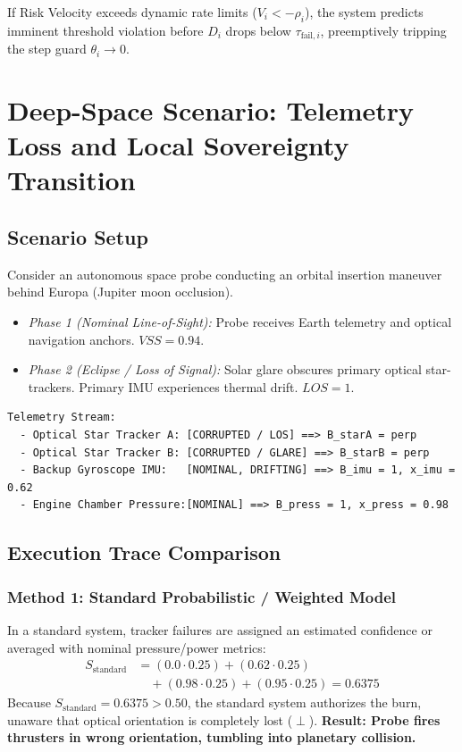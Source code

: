 \documentclass[journal]{IEEEtran}
\begin{document}
If Risk Velocity exceeds dynamic rate limits ($V_i < -\rho_i$), the system predicts imminent threshold violation before $D_i$ drops below $\tau_{\text{fail}, i}$, preemptively tripping the step guard $\theta_i \to 0$.

\section{Deep-Space Scenario: Telemetry Loss and Local Sovereignty Transition}

\subsection{Scenario Setup}
Consider an autonomous space probe conducting an orbital insertion maneuver behind Europa (Jupiter moon occlusion).
\begin{itemize}
    \item \emph{Phase 1 (Nominal Line-of-Sight):} Probe receives Earth telemetry and optical navigation anchors. $VSS = 0.94$.
    \item \emph{Phase 2 (Eclipse / Loss of Signal):} Solar glare obscures primary optical star-trackers. Primary IMU experiences thermal drift. $LOS = 1$.
\end{itemize}

\begin{verbatim}
Telemetry Stream:
  - Optical Star Tracker A: [CORRUPTED / LOS] ==> B_starA = perp
  - Optical Star Tracker B: [CORRUPTED / GLARE] ==> B_starB = perp
  - Backup Gyroscope IMU:   [NOMINAL, DRIFTING] ==> B_imu = 1, x_imu = 0.62
  - Engine Chamber Pressure:[NOMINAL] ==> B_press = 1, x_press = 0.98
\end{verbatim}

\subsection{Execution Trace Comparison}

\subsubsection{Method 1: Standard Probabilistic / Weighted Model}
In a standard system, tracker failures are assigned an estimated confidence or averaged with nominal pressure/power metrics:
\begin{align}
S_{\text{standard}} &= (0.0 \cdot 0.25) + (0.62 \cdot 0.25) \nonumber \\
&\quad + (0.98 \cdot 0.25) + (0.95 \cdot 0.25) = 0.6375
\end{align}
Because $S_{\text{standard}} = 0.6375 > 0.50$, the standard system authorizes the burn, unaware that optical orientation is completely lost ($\perp$). \textbf{Result: Probe fires thrusters in wrong orientation, tumbling into planetary collision.}
\end{document}
